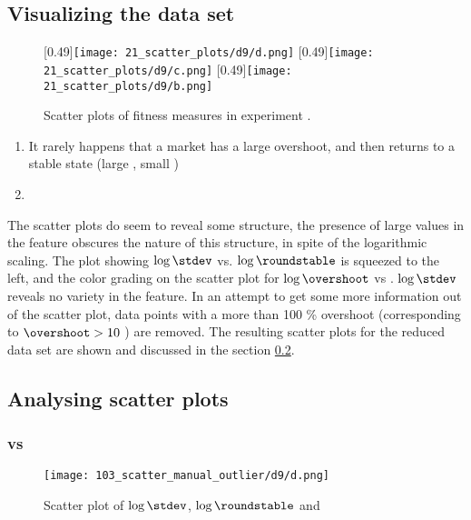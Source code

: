 \subsection{Visualizing the data set}
\begin{figure}
\centering
{}
[0.49\linewidth]{\texttt{[image: 21\_scatter\_plots/d9/d.png]}}
[0.49\linewidth]{\texttt{[image: 21\_scatter\_plots/d9/c.png]}}
[0.49\linewidth]{\texttt{[image: 21\_scatter\_plots/d9/b.png]}}
\caption{Scatter plots of fitness measures in experiment \dnine. }
\label{figure:d9_scatter_fitness}
\end{figure}



\begin{enumerate}
\item It rarely happens that a market has a large overshoot, and then returns to a stable state (large \overshoot, small \stdev)
\item 
\end{enumerate}


The scatter plots do seem to reveal some structure, the presence of large values in the \stdev feature obscures the nature of this structure, in spite of the logarithmic scaling. The plot showing $\log \stdev$ vs. $\log \roundstable$ is squeezed to the left, and the color grading on the scatter plot for $\log \overshoot$ vs . $\log \stdev$ reveals no variety in the \stdev feature. In an attempt to get some more information out of the scatter plot, data points with a more than 100 \% overshoot (corresponding to $\overshoot > 10$ ) are removed. The resulting scatter plots for the reduced data set are shown and discussed in the section \ref{section:d9_analysing_scatter_plots}.

\subsection{Analysing scatter plots}\label{section:d9_analysing_scatter_plots}

\subsubsection{\roundstable vs \stdev}
\begin{figure}
\centering
\texttt{[image: 103\_scatter\_manual\_outlier/d9/d.png]}
\caption{Scatter plot of $\log \stdev$, $\log \roundstable$ and \timetoreachnewfundamental}
\label{figure:d9_scatter_fitness_inliers_logs_logr_t}
\end{figure}

